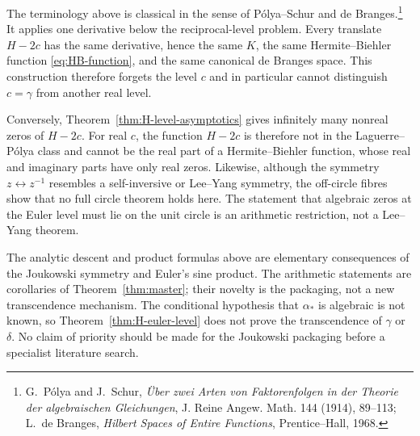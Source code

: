 \begin{remark}
The terminology above is classical in the sense of P\'olya--Schur and de
Branges.\footnote{G.~P\'olya and J.~Schur, \emph{Über zwei Arten von
Faktorenfolgen in der Theorie der algebraischen Gleichungen}, J. Reine
Angew. Math. 144 (1914), 89--113; L.~de Branges, \emph{Hilbert Spaces of
Entire Functions}, Prentice--Hall, 1968.}
It applies one derivative below the reciprocal-level problem.  Every
translate $H-2c$ has the same derivative, hence the same $K$, the same
Hermite--Biehler function \eqref{eq:HB-function}, and the same canonical de
Branges space.  This construction therefore forgets the level $c$ and in
particular cannot distinguish $c=\gamma$ from another real level.

Conversely, Theorem~\ref{thm:H-level-asymptotics} gives infinitely many
nonreal zeros of $H-2c$.  For real $c$, the function $H-2c$ is therefore not
in the Laguerre--P\'olya class and cannot be the real part of a
Hermite--Biehler function, whose real and imaginary parts have only real
zeros.  Likewise, although the symmetry $z\leftrightarrow z^{-1}$ resembles
a self-inversive or Lee--Yang symmetry, the off-circle fibres show that no
full circle theorem holds here.  The statement that algebraic zeros at the
Euler level must lie on the unit circle is an arithmetic restriction, not a
Lee--Yang theorem.
\end{remark}

\begin{remark}
The analytic descent and product formulas above are elementary consequences
of the Joukowski symmetry and Euler's sine product.  The arithmetic
statements are corollaries of Theorem~\ref{thm:master}; their novelty is the
packaging, not a new transcendence mechanism.  The conditional hypothesis
that $\alpha_*$ is algebraic is not known, so
Theorem~\ref{thm:H-euler-level} does not prove the transcendence of
$\gamma$ or $\delta$.  No claim of priority should be made for the
Joukowski packaging before a specialist literature search.
\end{remark}
